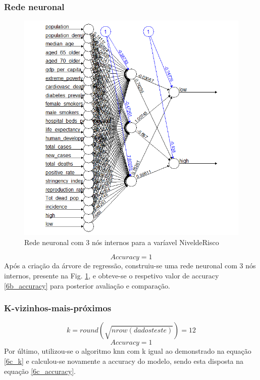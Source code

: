 \documentclass[conference]{IEEEtran}
\begin{document}
\subsubsection{Rede neuronal}
\begin{figure}[htbp]
\centerline{\includegraphics[width=0.95\columnwidth]{images/06_2.png}}
\caption{Rede neuronal com 3 nós internos para a varíavel NiveldeRisco}
\label{6b_neural}
\end{figure}
\begin{equation}
Accuracy = 1\label{6b_accuracy}
\end{equation}
Após a criação da árvore de regressão, construiu-se uma rede neuronal com 3 nós internos, presente na Fig. \ref{6b_neural}, e obteve-se o respetivo valor de accuracy \eqref{6b_accuracy} para posterior avaliação e comparação.


\subsubsection{K-vizinhos-mais-próximos}
\begin{equation}
k = round(\sqrt{nrow(dadosteste)})=12\label{6c_k}
\end{equation}
\begin{equation}
Accuracy = 1\label{6c_accuracy}
\end{equation}
Por último, utilizou-se o algoritmo knn com k igual ao demonstrado na equação \eqref{6c_k} \cite{knn} e calculou-se novamente a accuracy do modelo, sendo esta disposta na equação \eqref{6c_accuracy}.
\end{document}
